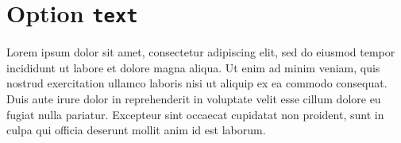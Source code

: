 \documentclass{article}
\begin{document}
\section{Option \texttt{text}}

Lorem ipsum dolor sit amet, consectetur adipiscing elit, sed do
eiusmod tempor incididunt ut labore et dolore magna aliqua. Ut enim ad
minim veniam, quis nostrud exercitation ullamco laboris nisi ut
aliquip ex ea commodo consequat. Duis aute irure dolor in
reprehenderit in voluptate velit esse cillum dolore eu fugiat nulla
pariatur. Excepteur sint occaecat cupidatat non proident, sunt in
culpa qui officia deserunt mollit anim id est laborum.
\end{document}
